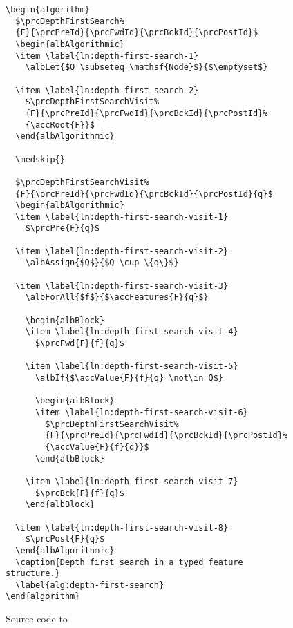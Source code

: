 \documentclass[11pt,a4paper,oneside,titlepage]{alb-corp}
\begin{document}
\begin{figure}
  \small{}
\begin{verbatim}
\begin{algorithm}
  $\prcDepthFirstSearch%
  {F}{\prcPreId}{\prcFwdId}{\prcBckId}{\prcPostId}$
  \begin{albAlgorithmic}
  \item \label{ln:depth-first-search-1}
    \albLet{$Q \subseteq \mathsf{Node}$}{$\emptyset$}

  \item \label{ln:depth-first-search-2}
    $\prcDepthFirstSearchVisit%
    {F}{\prcPreId}{\prcFwdId}{\prcBckId}{\prcPostId}%
    {\accRoot{F}}$
  \end{albAlgorithmic}

  \medskip{}

  $\prcDepthFirstSearchVisit%
  {F}{\prcPreId}{\prcFwdId}{\prcBckId}{\prcPostId}{q}$
  \begin{albAlgorithmic}
  \item \label{ln:depth-first-search-visit-1}
    $\prcPre{F}{q}$

  \item \label{ln:depth-first-search-visit-2}
    \albAssign{$Q$}{$Q \cup \{q\}$}

  \item \label{ln:depth-first-search-visit-3}
    \albForAll{$f$}{$\accFeatures{F}{q}$}

    \begin{albBlock}
    \item \label{ln:depth-first-search-visit-4}
      $\prcFwd{F}{f}{q}$

    \item \label{ln:depth-first-search-visit-5}
      \albIf{$\accValue{F}{f}{q} \not\in Q$}

      \begin{albBlock}
      \item \label{ln:depth-first-search-visit-6}
        $\prcDepthFirstSearchVisit%
        {F}{\prcPreId}{\prcFwdId}{\prcBckId}{\prcPostId}%
        {\accValue{F}{f}{q}}$
      \end{albBlock}

    \item \label{ln:depth-first-search-visit-7}
      $\prcBck{F}{f}{q}$
    \end{albBlock}

  \item \label{ln:depth-first-search-visit-8}
    $\prcPost{F}{q}$
  \end{albAlgorithmic}
  \caption{Depth first search in a typed feature structure.}
  \label{alg:depth-first-search}
\end{algorithm}
\end{verbatim}
  \caption{Source code to \prcDepthFirstSearchId{}}
  \label{fig:alb-algorithms-documentation:source-code-prcd}
\end{figure}
\end{document}
